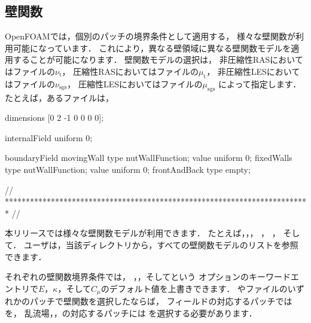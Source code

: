 \subsection{壁関数}
\label{ssec:7.2.2}
OpenFOAMでは，個別のパッチの境界条件として適用する，
様々な壁関数が利用可能になっています．
これにより，異なる壁領域に異なる壁関数モデルを適用することが可能になります．
壁関数モデルの選択は，
非圧縮性RASにおいてはファイルの$\nu_{\mathrm{t}}$，
圧縮性RASにおいてはファイルの$\mu_{\mathrm{t}}$，
非圧縮性LESにおいてはファイルの$\nu_{\mathrm{sgs}}$，
圧縮性LESにおいてはファイルの$\mu_{\mathrm{sgs}}$
によって指定します．
たとえば，あるファイルは，
\begin{OFverbatim}[file, linenum=17]

dimensions      [0 2 -1 0 0 0 0];

internalField   uniform 0;

boundaryField
{
    movingWall
    {
        type            nutWallFunction;
        value           uniform 0;
    }
    fixedWalls
    {
        type            nutWallFunction;
        value           uniform 0;
    }
    frontAndBack
    {
        type            empty;
    }
}


// ************************************************************************* //
\end{OFverbatim}
本リリースでは様々な壁関数モデルが利用できます．
たとえば，，，
，
，
そして．
ユーザは，当該ディレクトリから，すべての壁関数モデルのリストを参照できます．

それぞれの壁関数境界条件では，
，，そしてという
オプションのキーワードエントリで$E$，$\kappa$，そして$C_{\mu}$のデフォルト値を上書きできます．
やファイルのいずれかのパッチで壁関数を選択したならば，
フィールドの対応するパッチではを，
乱流場，，の対応するパッチには
を選択する必要があります．

